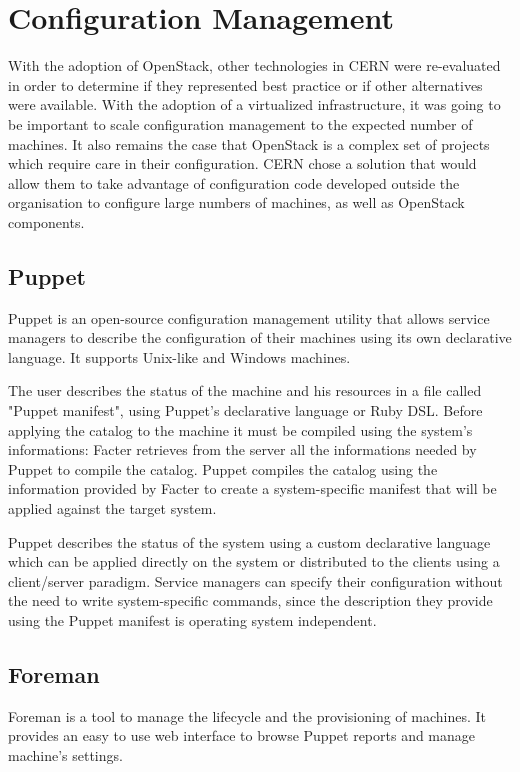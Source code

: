 \section{Configuration Management}

With the adoption of OpenStack, other technologies in CERN were 
re-evaluated in order to determine if they represented best practice or
if other alternatives were available. With the adoption of a virtualized
infrastructure, it was going to be important to scale configuration
management to the expected number of machines. It also remains the case
that OpenStack is a complex set of projects which require care in their
configuration. CERN chose a solution that would allow them to take 
advantage of configuration code developed outside the organisation to 
configure large numbers of machines, as well as OpenStack components.

\subsection{Puppet}

Puppet is an open-source configuration management utility that allows
service managers to describe the configuration of their machines using its
own declarative language. It supports Unix-like and Windows machines.

The user describes the status of the machine and his resources in a file
called "Puppet manifest", using Puppet's declarative language or Ruby DSL.
Before applying the catalog to the machine it must be compiled using the
system's informations: Facter retrieves from the server all the
informations needed by Puppet to compile the catalog. Puppet compiles the
catalog using the information provided by Facter to create
a system-specific manifest that will be applied against the target system.

Puppet describes the status of the system using a custom declarative
language which can be applied directly on the system or distributed to the
clients using a client/server paradigm. Service managers can specify their
configuration without the need to write system-specific commands, since
the description they provide using the Puppet manifest is operating system
independent.

\subsection{Foreman}

Foreman is a tool to manage the lifecycle and the provisioning of
machines. It provides an easy to use web interface to browse Puppet
reports and manage machine's settings.

